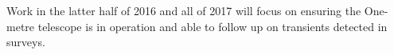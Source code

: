 \documentclass[a4paper,fleqn,usenatbib]{mnras}
\begin{document}
Work in the latter half of 2016 and all of 2017 will focus on ensuring the One-metre telescope is in operation and able to follow up on transients detected in surveys.






 










\bsp	%
\label{lastpage}
\end{document}
